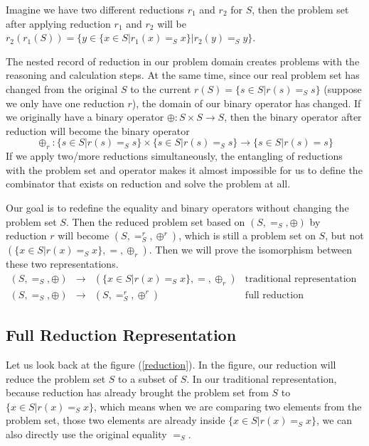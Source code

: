 \documentclass[a4paper,12pt,twoside,openright]{report}
\begin{document}
Imagine we have two different reductions $r_1$ and $r_2$ for $S$, then the problem set after applying reduction $r_1$ and $r_2$ will be $r_2(r_1(S)) = \{y\in \{x \in S | r_1(x) =_S x\}|r_2(y)=_S y\}$. 

The nested  record of reduction in our problem domain creates problems with the reasoning and calculation steps. 
At the same time, since our real problem set has changed from the original $S$ to the current $r(S) = \{s\in S|r(s)=_S s\}$ (suppose we only have one reduction $r$), the domain of our binary operator has changed. If we originally have a binary operator $\oplus : S\times S \rightarrow S$, then the binary operator after reduction will become the binary operator \[\oplus_r : \{s\in S|r(s)=_S s\} \times \{s\in S|r(s)=_S s\} \rightarrow \{s\in S|r(s)= s\}\] If we apply two/more reductions simultaneously, the entangling of reductions with the problem set and operator makes it almost impossible for us to define the combinator that exists on reduction and solve the problem at all.

Our goal is to redefine the equality and binary operators without changing the problem set $S$. 
Then the reduced problem set based on $(S,=_S,\oplus)$ by reduction $r$ will become $(S,=^r_S,\oplus^r)$, which is still a problem set on $S$, but not $(\{x \in S | r(x) =_S x\}, =,\oplus_r)$. 
Then we will prove the isomorphism between these two representations.
\[
\begin{array}{rcll}
(S,=_S,\oplus) & \longrightarrow & (\{x \in S | r(x) =_S x\}, =,\oplus_r) & \mbox {traditional representation}\\
(S,=_S,\oplus) & \longrightarrow & (S,=^r_S,\oplus^r) & \mbox{full reduction representation}
\end{array}
\]

\subsection{Full Reduction Representation}
Let us look back at the figure (\ref{reduction}). In the figure, our reduction will reduce the problem set $S$ to a subset of $S$. In our traditional representation, because reduction has already brought the problem set from $S$ to $\{x \in S | r(x) =_S x\}$, which means when we are comparing two elements from the problem set, those two elements are already inside $\{x \in S | r(x) =_S x\}$, we can also directly use the original equality $=_S$.
\end{document}
